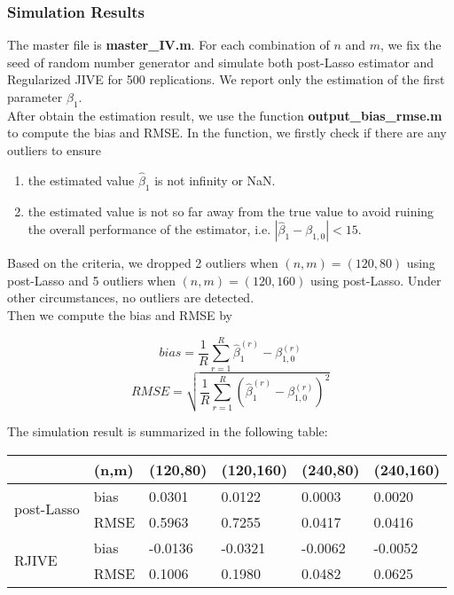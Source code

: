 \documentclass[12pt, a4paper]{article}
\begin{document}
\subsubsection*{Simulation Results}
The master file is \textbf{master\_IV.m}. For each combination of $n$ and $m$, we fix the seed of random number generator and simulate both post-Lasso estimator and Regularized JIVE for 500 replications. We report only the estimation of the first parameter $\beta_1$.\\
\noindent After obtain the estimation result, we use the function \textbf{output\_bias\_rmse.m} to compute the bias and RMSE. In the function, we firstly check if there are any outliers to ensure
\begin{enumerate}
	\item the estimated value $\hat{\beta}_1$ is not infinity or NaN.
	\item the estimated value is not so far away from the true value to avoid ruining the overall performance of the estimator, i.e. $ |\hat{\beta}_1 - \beta_{1,0} | < 15$.
\end{enumerate}
Based on the criteria, we dropped 2 outliers when $(n,m) = (120,80)$ using post-Lasso and 5 outliers when $(n,m) = (120,160)$ using post-Lasso. Under other circumstances, no outliers are detected.\\

\noindent Then we compute the bias and RMSE by

\begin{equation}
bias =\frac{1}{R}\sum\limits_{r = 1}^R\hat{\beta}_1^{(r)} - \beta_{1,0}^{(r)}
\end{equation}
\begin{equation}
RMSE = \sqrt{\frac{1}{R}\sum\limits_{r=1}^R(\hat{\beta}_1^{(r)} - \beta_{1,0}^{(r)})^2}
\end{equation}

\noindent The simulation result is summarized in the following table:\\

\begin{tabular}{ |p{1.5cm}|p{1.8cm}|p{1.8cm}|p{1.8cm}|p{1.8cm}|p{1.8cm}|  }
	\hline
	&(n,m) & (120,80) & (120,160) & (240,80) & (240,160)\\
	\hline
	\multirow{2}{0pt}{post-Lasso} & bias & 0.0301 & 0.0122 &	0.0003 & 0.0020\\
	& RMSE & 0.5963 & 0.7255 & 0.0417 & 0.0416\\
	\hline
	\multirow{2}{0pt}{RJIVE} & bias & -0.0136 & -0.0321 & -0.0062 & -0.0052\\
	& RMSE & 0.1006 & 0.1980 & 0.0482 &	0.0625\\
	\hline
\end{tabular}

\newpage


\end{document}
